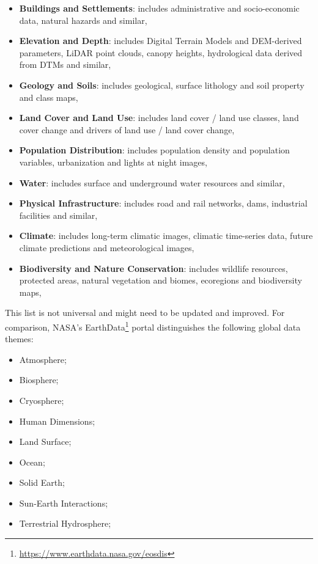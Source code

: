 \documentclass[
  graybox,natbib,nospthms]{svmono}
\providecommand{\tightlist}{%
  \setlength{\itemsep}{0pt}\setlength{\parskip}{0pt}}
\providecommand{\tightlist}{\setlength{\itemsep}{0pt}\setlength{\parskip}{0pt}}
\renewcommand{\href}[2]{#2 (\url{#1})}
\renewcommand{\href}[2]{#2\footnote{\url{#1}}}
\begin{document}
\begin{itemize}
\tightlist
\item
  \textbf{Buildings and Settlements}: includes administrative and socio-economic data, natural hazards and similar,
\item
  \textbf{Elevation and Depth}: includes Digital Terrain Models and DEM-derived parameters, LiDAR point clouds, canopy heights, hydrological data derived from DTMs and similar,
\item
  \textbf{Geology and Soils}: includes geological, surface lithology and soil property and class maps,
\item
  \textbf{Land Cover and Land Use}: includes land cover / land use classes, land cover change and drivers of land use / land cover change,
\item
  \textbf{Population Distribution}: includes population density and population variables, urbanization and lights at night images,
\item
  \textbf{Water}: includes surface and underground water resources and similar,
\item
  \textbf{Physical Infrastructure}: includes road and rail networks, dams, industrial facilities and similar,
\item
  \textbf{Climate}: includes long-term climatic images, climatic time-series data, future climate predictions and meteorological images,
\item
  \textbf{Biodiversity and Nature Conservation}: includes wildlife resources, protected areas, natural vegetation and biomes, ecoregions and biodiversity maps,
\end{itemize}

This list is not universal and might need to be updated and improved. For comparison, \href{https://www.earthdata.nasa.gov/eosdis}{NASA's EarthData}
portal distinguishes the following global data themes:

\begin{itemize}
\tightlist
\item
  Atmosphere;
\item
  Biosphere;
\item
  Cryosphere;
\item
  Human Dimensions;
\item
  Land Surface;
\item
  Ocean;
\item
  Solid Earth;
\item
  Sun-Earth Interactions;
\item
  Terrestrial Hydrosphere;
\end{itemize}
\end{document}
